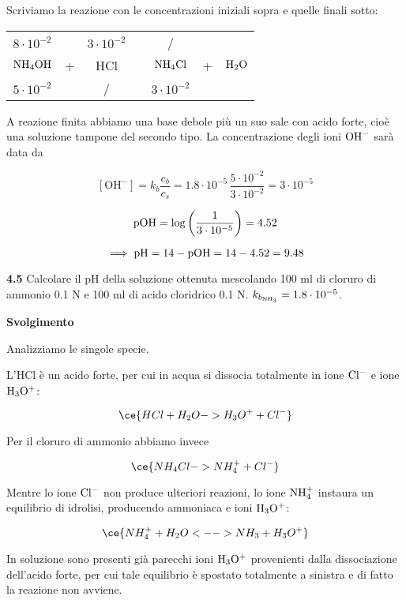 Scriviamo la reazione con le concentrazioni iniziali sopra e quelle finali sotto:

\begin{center}
    \begin{tabular}{ccccccc}
        $8 \cdot 10^{-2}$ &  & $3 \cdot 10^{-2}$ & & / &&\\
        $\rm NH_4OH$ & + & HCl & \ce{->} & $\rm NH_4Cl$ & + & $\rm H_2O$\\
        $5 \cdot 10^{-2}$ &  &  / & & $3 \cdot 10^{-2}$&&\\
    \end{tabular}
\end{center}

A reazione finita abbiamo una base debole più un suo sale con acido forte, cioè una soluzione tampone del secondo tipo. La concentrazione degli ioni $\rm OH^-$ sarà data da

$$[\text{OH}^-]=k_b\frac{c_b}{c_s}
=1.8 \cdot 10^{-5}\,\frac{5 \cdot 10^{-2}}{3 \cdot 10^{-2}}= 3 \cdot 10^{-5}$$

$$\rm pOH=\log\left(\frac{1}{3 \cdot 10^{-5}}\right)=4.52$$

$$\implies \rm pH=14-pOH=14-4.52=9.48$$



\vspace{0.2cm}\textbf{4.5} Calcolare il pH della soluzione ottenuta mescolando 100 ml di cloruro di ammonio 0.1 N e 100
ml di acido cloridrico 0.1 N. $k_{b_{\rm NH_3}}=1.8 \cdot 10^{-5}$.

\vspace{0.2cm}\large\textbf{Svolgimento}\normalsize

\vspace{0.2cm}Analizziamo le singole specie.

L'HCl è un acido forte, per cui in acqua si dissocia totalmente in ione $\rm Cl^-$ e ione $\rm H_3O^+$:

$$\ce{HCl + H_2O -> H_3O^+ + Cl^-}$$

Per il cloruro di ammonio abbiamo invece

$$\ce{NH_4Cl -> NH_4^+ + Cl^-}$$

Mentre lo ione $\rm Cl^-$ non produce ulteriori reazioni, lo ione $\rm NH_4^+$ instaura un equilibrio di idrolisi, producendo ammoniaca e ioni $\rm H_3O^+$:

$$\ce{NH_4^+ + H_2O <--> NH_3 + H_3O^+}$$

In soluzione sono presenti già parecchi ioni $\rm H_3O^+$ provenienti dalla dissociazione dell'acido forte, per cui tale equilibrio è spostato totalmente a sinistra e di fatto la reazione non avviene.

